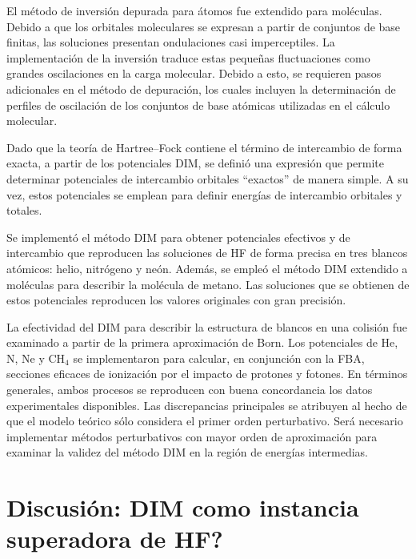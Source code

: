 {{{{El método de inversión depurada para átomos fue extendido para 
moléculas. Debido a que los orbitales moleculares se expresan a partir 
de conjuntos de base finitas, las soluciones presentan ondulaciones casi 
imperceptiles. La implementación de la inversión traduce estas pequeñas 
fluctuaciones como grandes oscilaciones en la carga molecular. Debido a 
esto, se requieren pasos adicionales en el método de depuración, los 
cuales incluyen la determinación de perfiles de oscilación de los 
conjuntos de base atómicas utilizadas en el cálculo molecular. 

Dado que la teoría de Hartree--Fock contiene el término de intercambio
de forma exacta, a partir de los potenciales DIM, se definió una 
expresión que permite determinar potenciales de intercambio orbitales 
``exactos'' de manera simple. A su vez, estos potenciales se emplean 
para definir energías de intercambio orbitales y totales.

Se implementó el método DIM para obtener potenciales efectivos y de 
intercambio que reproducen las soluciones de HF de forma precisa en tres 
blancos atómicos: helio, nitrógeno y neón. Además, se empleó el método 
DIM extendido a moléculas para describir la molécula de metano. Las 
soluciones que se obtienen de estos potenciales reproducen los valores
originales con gran precisión. 

La efectividad del DIM para describir la estructura de blancos en una 
colisión fue examinado a partir de la primera aproximación de Born. Los 
potenciales de He, N, Ne y CH$_4$ se implementaron para calcular, en 
conjunción con la FBA, secciones eficaces de ionización por el impacto 
de protones y fotones. En términos generales, ambos procesos se 
reproducen con buena concordancia los datos experimentales disponibles. 
Las discrepancias principales se atribuyen al hecho de que el modelo 
teórico sólo considera el primer orden perturbativo. Será necesario 
implementar métodos perturbativos con mayor orden de aproximación para 
examinar la validez del método DIM en la región de energías intermedias.


\section{Discusión: DIM como instancia superadora de HF?}
\label{sec:discusion}


}}}}
